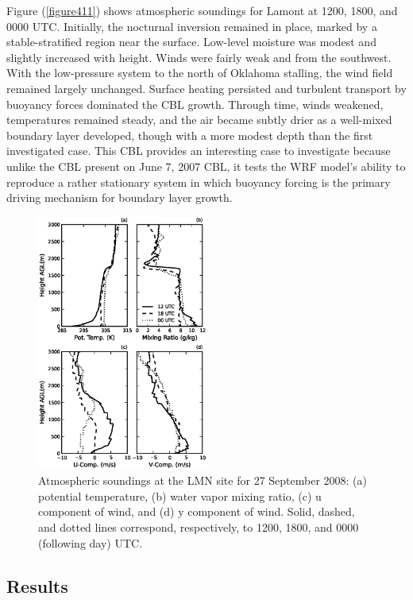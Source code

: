 Figure (\autoref{figure411}) shows atmospheric soundings for Lamont at 1200, 1800, and 0000 UTC. Initially, the nocturnal inversion remained in place, marked by a stable-stratified region near the surface. Low-level moisture was modest and slightly increased with height. Winds were fairly weak and from the southwest. With the low-pressure system to the north of Oklahoma stalling, the wind field remained largely unchanged. Surface heating persisted and turbulent transport by buoyancy forces dominated the CBL growth. Through time, winds weakened, temperatures remained steady, and the air became subtly drier as a well-mixed boundary layer developed, though with a more modest depth than the first investigated case. This CBL provides an interesting case to investigate because unlike the CBL present on June 7, 2007 CBL, it tests the WRF model's ability to reproduce a rather stationary system in which buoyancy forcing is the primary driving mechanism for boundary layer growth.


\begin{figure}[H]
\begin{center}
\includegraphics[width=0.5\textwidth]{figures/chapter4/20080927_lmnsounding}
\end{center}
\caption{Atmospheric soundings at the LMN site for 27 September 2008: (a) potential temperature, (b) water vapor mixing ratio, (c) u component of wind, and (d) y component of wind. Solid, dashed, and dotted lines correspond, respectively, to 1200, 1800, and 0000 (following day) UTC.}
\label{figure411}
\end{figure}


\subsection{Results}
\label{res-442}

